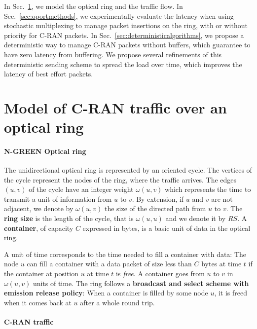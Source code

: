\documentclass[]{llncs}
\begin{document}
In Sec.~\ref{sec:model}, we model the optical ring and the traffic flow. In Sec.~\ref{sec:oportmethods}, we experimentally evaluate the latency when using stochastic multiplexing to manage packet insertions on the ring, with or without priority for C-RAN packets. In Sec.~\ref{sec:deterministicalgorithms}, we propose a deterministic way to manage C-RAN packets without buffers, which guarantee to have zero latency from buffering. We propose several refinements of this deterministic sending scheme to spread the load over time, which improves the latency of best effort packets.

\section{Model of C-RAN traffic over an optical ring}
\label{sec:model}
    
  \paragraph{N-GREEN Optical ring}
   
  The unidirectional optical ring is represented by an oriented cycle. The vertices of the cycle represent the nodes of the ring, where the traffic arrives. The edges $(u,v)$ of the cycle have an integer weight $\omega(u,v)$ which represents the time to transmit a unit of information from $u$ to $v$. By extension, if $u$ and $v$ are not adjacent, we denote by $\omega(u,v)$ the size of the directed path from $u$ to $v$.  The \textbf{ring size} is the length of the cycle, that is $\omega(u,u)$ and we denote it by $RS$. A {\bf container}, of capacity $C$  expressed in bytes, is a basic unit of data in the optical ring. 
  
  A unit of time corresponds to the time needed to fill a container with data:
  The node $u$ can fill a container with a data packet of size less than $C$ bytes at time $t$ if the container 
  at position $u$ at time $t$ is \emph{free}. A container goes from $u$ to $v$ in $\omega(u,v)$ units of time. The ring follows a {\bf broadcast and select scheme with emission release policy}: When a container is filled by some node $u$, it is freed when it comes back at $u$ after a whole round trip.
  
     \paragraph{C-RAN traffic}
   
\end{document}
